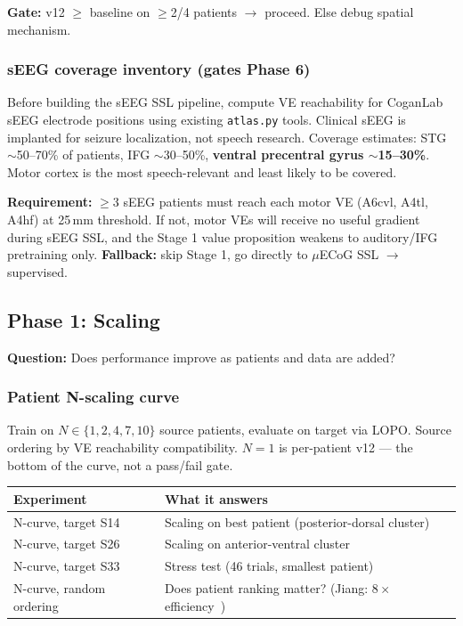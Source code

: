 \documentclass[11pt,letterpaper]{article}
\begin{document}
\textbf{Gate:} v12 $\geq$ baseline on $\geq$2/4 patients $\to$ proceed. Else debug spatial mechanism.

\subsubsection{sEEG coverage inventory (gates Phase 6)}

Before building the sEEG SSL pipeline, compute VE reachability for CoganLab sEEG electrode positions using existing \texttt{atlas.py} tools. Clinical sEEG is implanted for seizure localization, not speech research. Coverage estimates: STG ${\sim}$50--70\% of patients, IFG ${\sim}$30--50\%, \textbf{ventral precentral gyrus ${\sim}$15--30\%}. Motor cortex is the most speech-relevant and least likely to be covered.

\textbf{Requirement:} $\geq$3 sEEG patients must reach each motor VE (A6cvl, A4tl, A4hf) at 25\,mm threshold. If not, motor VEs will receive no useful gradient during sEEG SSL, and the Stage 1 value proposition weakens to auditory/IFG pretraining only. \textbf{Fallback:} skip Stage 1, go directly to $\mu$ECoG SSL $\to$ supervised.

\subsection{Phase 1: Scaling}\label{sec:phase1}

\textbf{Question:} Does performance improve as patients and data are added?

\subsubsection{Patient N-scaling curve}

Train on $N \in \{1, 2, 4, 7, 10\}$ source patients, evaluate on target via LOPO. Source ordering by VE reachability compatibility. $N{=}1$ is per-patient v12 --- the bottom of the curve, not a pass/fail gate.

\begin{table}[ht!]\centering\small
\begin{tabular}{@{}lp{8cm}@{}}
\toprule
\textbf{Experiment} & \textbf{What it answers} \\
\midrule
N-curve, target S14 & Scaling on best patient (posterior-dorsal cluster) \\
N-curve, target S26 & Scaling on anterior-ventral cluster \\
N-curve, target S33 & Stress test (46 trials, smallest patient) \\
N-curve, random ordering & Does patient ranking matter? (Jiang: $8\times$ efficiency~\cite{jiang2025}) \\
\bottomrule
\end{tabular}
\end{table}
\end{document}
